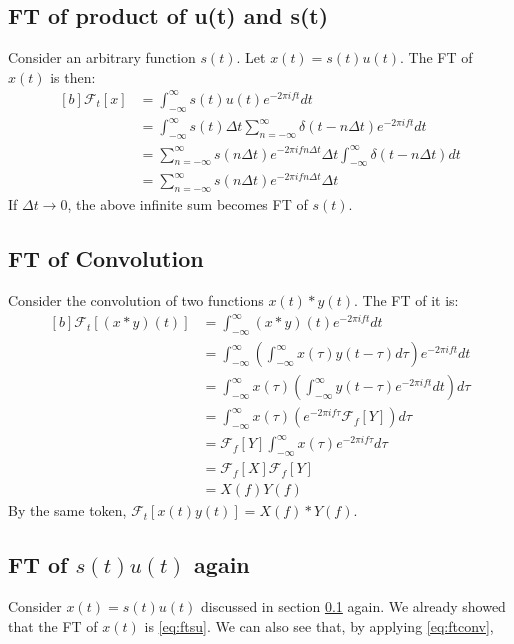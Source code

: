 \documentclass[letterpaper, 11pt]{article}
\newcommand{\fint}{\int_{-\infty}^{\infty}} %
\newcommand{\fsum}[1]{\sum_{#1 = -\infty}^{\infty}} %
\newcommand{\spf}[2]{\Delta #1 \fsum{#2} \delta (#1 - #2 \Delta #1)} %
\newcommand{\fourier}[2]{\mathcal{F}_{#1}[#2]} %
\newcommand{\ft}[3]{\fint #2 e^{-2\pi i#3#1} d#1} %
\newcommand{\conv}[4]{\fint #3(#2)#4(#1 - #2) d#2} %
\numberwithin{equation}{section}
\numberwithin{figure}{section}
\numberwithin{table}{section}
\begin{document}
\subsection{FT of product of u(t) and s(t)}\label{sec:su}
Consider an arbitrary function \(s(t)\). Let \(x(t) = s(t)u(t)\). The FT of \(x(t)\) is then:
\begin{equation}
	\begin{aligned}[b]
		\fourier{t}{x}
			&= \ft{t}{s(t)u(t)}{f}\\
			&= \ft{t}{s(t) \spf{t}{n}}{f}\\
			&= \fsum{n} s(n \Delta t) e^{-2\pi ifn\Delta t} \Delta t 
			   \fint \delta (t - n\Delta t) dt\\
			&= \fsum{n} s(n \Delta t) e^{-2\pi ifn\Delta t} \Delta t 
			\label{eq:ftsu}
	\end{aligned}
\end{equation}
If \(\Delta t \to 0\), the above infinite sum becomes FT of \(s(t)\). 
\subsection{FT of Convolution}
Consider the convolution of two functions \(x(t)*y(t)\). The FT of it is:
\begin{equation}
	\begin{aligned}[b]
		\fourier{t}{(x*y)(t)}
			&= \ft{t}{(x*y)(t)}{f}\\
			&= \ft{t}{\left (\conv{t}{\tau}{x}{y} \right )}{f}\\ 
			&= \fint x(\tau) \left (\fint y(t - \tau) e^{-2\pi ift} dt \right ) d\tau\\
			&= \fint x(\tau) \left ( e^{-2\pi if\tau}\fourier{f}{Y} \right )d\tau\\ 
			&= \fourier{f}{Y} \ft{\tau}{x(\tau)}{f}\\
			&= \fourier{f}{X} \fourier{f}{Y}\\
			&= X(f)Y(f)
			\label{eq:ftconv}
	\end{aligned}
\end{equation}
By the same token, \(\fourier{t}{x(t)y(t)} = X(f)*Y(f)\). 

\subsection{FT of \(s(t)u(t)\) again}
Consider \(x(t) = s(t)u(t)\) discussed in section \ref{sec:su} again. We already showed that the FT of \(x(t)\) is \eqref{eq:ftsu}. We can also see that, by applying \eqref{eq:ftconv}, 
\printindex
\end{document}
